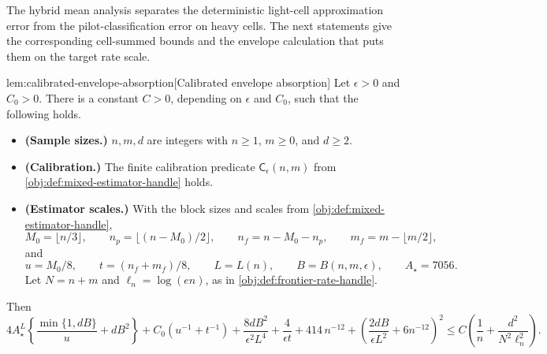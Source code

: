 \documentclass[11pt]{article}
\begin{document}
The hybrid mean analysis separates the deterministic light-cell approximation error from the pilot-classification error on heavy cells. The next statements give the corresponding cell-summed bounds and the envelope calculation that puts them on the target rate scale.

\begin{lemmav}{lem:calibrated-envelope-absorption}[Calibrated envelope absorption]
Let \(\epsilon>0\) and \(C_0>0\). There is a constant \(C>0\), depending on \(\epsilon\) and \(C_0\), such that the following holds.

\begin{itemize}
\item \textbf{(Sample sizes.)} \(n,m,d\) are integers with \(n\ge 1\), \(m\ge 0\), and \(d\ge 2\).
\item \textbf{(Calibration.)} The finite calibration predicate \(\mathsf C_\epsilon(n,m)\) from \cref{obj:def:mixed-estimator-handle} holds.
\item \textbf{(Estimator scales.)} With the block sizes and scales from \cref{obj:def:mixed-estimator-handle},
\[
M_0=\lfloor n/3\rfloor,\qquad
n_p=\lfloor (n-M_0)/2\rfloor,\qquad
n_f=n-M_0-n_p,\qquad
m_f=m-\lfloor m/2\rfloor,
\]
and
\[
u=M_0/8,\qquad
t=(n_f+m_f)/8,\qquad
L=L(n),\qquad
B=B(n,m,\epsilon),\qquad
A_\star=7056.
\]
Let \(N=n+m\) and \(\ell_n=\log(en)\), as in \cref{obj:def:frontier-rate-handle}.
\end{itemize}

Then
\[
4A_\star^L
\left\{
\frac{\min\{1,dB\}}{u}+dB^2
\right\}
+C_0\left(u^{-1}+t^{-1}\right)
+\frac{8dB^2}{\epsilon^2L^4}
+\frac{4}{\epsilon t}
+414\,n^{-12}
+\left(
\frac{2dB}{\epsilon L^2}
+6n^{-12}
\right)^2
\le
C\left(
\frac{1}{n}
+\frac{d^2}{N^2\ell_n^2}
\right).
\]
\end{lemmav}
\end{document}
